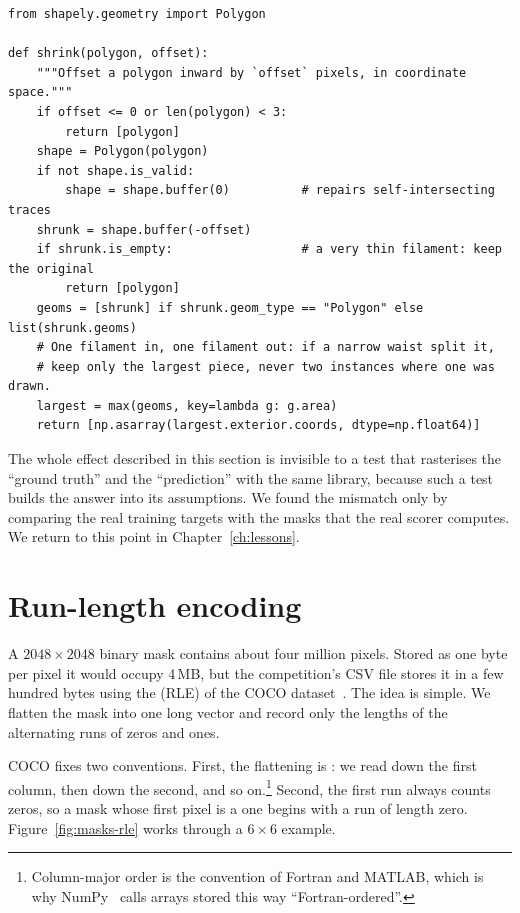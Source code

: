 \begin{lstlisting}[caption={Half-pixel inward offset for YOLO training targets. Simplified from \file{experiments/exp\_002\_yolo\_seg/src/prepare\_yolo.py:shrink}.},label=lst:masks-shrink]
from shapely.geometry import Polygon

def shrink(polygon, offset):
    """Offset a polygon inward by `offset` pixels, in coordinate space."""
    if offset <= 0 or len(polygon) < 3:
        return [polygon]
    shape = Polygon(polygon)
    if not shape.is_valid:
        shape = shape.buffer(0)          # repairs self-intersecting traces
    shrunk = shape.buffer(-offset)
    if shrunk.is_empty:                  # a very thin filament: keep the original
        return [polygon]
    geoms = [shrunk] if shrunk.geom_type == "Polygon" else list(shrunk.geoms)
    # One filament in, one filament out: if a narrow waist split it,
    # keep only the largest piece, never two instances where one was drawn.
    largest = max(geoms, key=lambda g: g.area)
    return [np.asarray(largest.exterior.coords, dtype=np.float64)]
\end{lstlisting}

The whole effect described in this section is invisible to a test that rasterises the ``ground
truth'' and the ``prediction'' with the same library, because such a test builds the answer into
its assumptions. We found the mismatch only by comparing the real training targets with the masks
that the real scorer computes. We return to this point in Chapter~\ref{ch:lessons}.

\section{Run-length encoding}\label{sec:masks-rle}
A $2048\times2048$ binary mask contains about four million pixels. Stored as one byte per pixel it
would occupy 4\,MB, but the competition's CSV file stores it in a few hundred bytes using the
 (RLE) of the COCO dataset~\citep{coco}. The idea is simple. We flatten the mask
into one long vector and record only the lengths of the alternating runs of zeros and ones.

COCO fixes two conventions. First, the flattening is : we read down the
first column, then down the second, and so on.\footnote{Column-major order is the convention of
Fortran and MATLAB, which is why NumPy~\citep{harris2020} calls arrays stored this way
``Fortran-ordered''.} Second, the first run always counts zeros, so a mask
whose first pixel is a one begins with a run of length zero. Figure~\ref{fig:masks-rle} works
through a $6\times6$ example.

